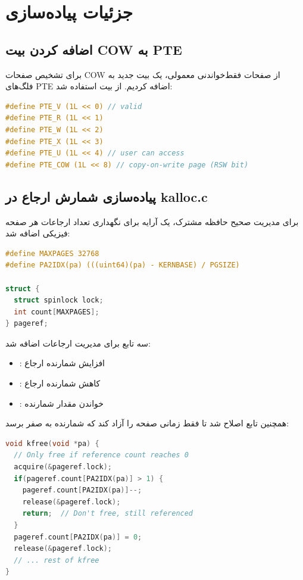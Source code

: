 \documentclass[12pt,a4paper]{article}
\begin{document}
\section{جزئیات پیاده‌سازی}

\subsection{اضافه کردن بیت COW به PTE}
برای تشخیص صفحات COW از صفحات فقط‌خواندنی معمولی، یک بیت جدید به فلگ‌های PTE اضافه کردیم. از بیت  استفاده شد:

\begin{latin}
\begin{lstlisting}[language=C, caption={تعریف بیت COW در riscv.h}]
#define PTE_V (1L << 0) // valid
#define PTE_R (1L << 1)
#define PTE_W (1L << 2)
#define PTE_X (1L << 3)
#define PTE_U (1L << 4) // user can access
#define PTE_COW (1L << 8) // copy-on-write page (RSW bit)
\end{lstlisting}
\end{latin}

\subsection{پیاده‌سازی شمارش ارجاع در kalloc.c}
برای مدیریت صحیح حافظه مشترک، یک آرایه برای نگهداری تعداد ارجاعات هر صفحه فیزیکی اضافه شد:

\begin{latin}
\begin{lstlisting}[language=C, caption={ساختار شمارش ارجاع}]
#define MAXPAGES 32768
#define PA2IDX(pa) (((uint64)(pa) - KERNBASE) / PGSIZE)

struct {
  struct spinlock lock;
  int count[MAXPAGES];
} pageref;
\end{lstlisting}
\end{latin}

سه تابع برای مدیریت ارجاعات اضافه شد:
\begin{itemize}
    \item {}: افزایش شمارنده ارجاع
    \item {}: کاهش شمارنده ارجاع
    \item {}: خواندن مقدار شمارنده
\end{itemize}

همچنین تابع  اصلاح شد تا فقط زمانی صفحه را آزاد کند که شمارنده به صفر برسد:

\begin{latin}
\begin{lstlisting}[language=C, caption={تابع kfree اصلاح‌شده}]
void kfree(void *pa) {
  // Only free if reference count reaches 0
  acquire(&pageref.lock);
  if(pageref.count[PA2IDX(pa)] > 1) {
    pageref.count[PA2IDX(pa)]--;
    release(&pageref.lock);
    return;  // Don't free, still referenced
  }
  pageref.count[PA2IDX(pa)] = 0;
  release(&pageref.lock);
  // ... rest of kfree
}
\end{lstlisting}
\end{latin}
\end{document}
